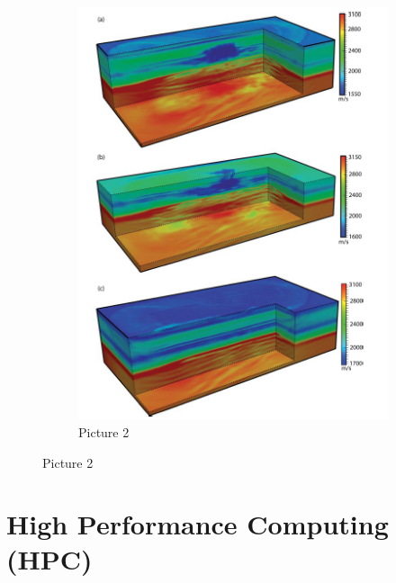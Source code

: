 \begin{figure}
\begin{subfigure}[b]{0.4\textwidth}
    \includegraphics[width=\textwidth]{images/3Dsim3.png}
    \caption{Picture 2}
    \label{sim3}
  \end{subfigure}
\end{figure}
\section{High Performance Computing (HPC)} 
